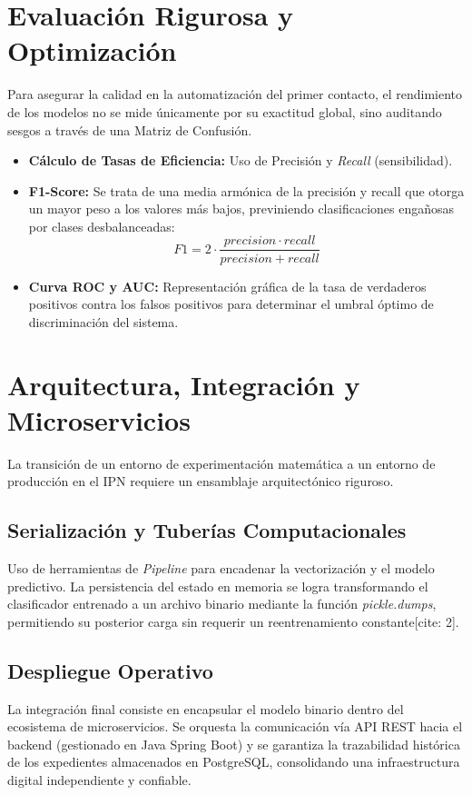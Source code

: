 \section{Evaluación Rigurosa y Optimización}

    Para asegurar la calidad en la automatización del primer contacto, el rendimiento de los modelos no se mide únicamente por su exactitud global, sino auditando sesgos a través de una Matriz de Confusión.
    
    \begin{itemize}
        \item \textbf{Cálculo de Tasas de Eficiencia:} Uso de Precisión y \textit{Recall} (sensibilidad).
        \item \textbf{F1-Score:} Se trata de una media armónica de la precisión y recall que otorga un mayor peso a los valores más bajos, previniendo clasificaciones engañosas por clases desbalanceadas:
        $$F1 = 2 \cdot \frac{precision \cdot recall}{precision + recall}$$
        \item \textbf{Curva ROC y AUC:} Representación gráfica de la tasa de verdaderos positivos contra los falsos positivos para determinar el umbral óptimo de discriminación del sistema.
    \end{itemize}

\section{Arquitectura, Integración y Microservicios}

    La transición de un entorno de experimentación matemática a un entorno de producción en el IPN requiere un ensamblaje arquitectónico riguroso.
    
    \subsection{Serialización y Tuberías Computacionales}
    Uso de herramientas de \textit{Pipeline} para encadenar la vectorización y el modelo predictivo. La persistencia del estado en memoria se logra transformando el clasificador entrenado a un archivo binario mediante la función \textit{pickle.dumps}, permitiendo su posterior carga sin requerir un reentrenamiento constante[cite: 2].
    
    \subsection{Despliegue Operativo}
    La integración final consiste en encapsular el modelo binario dentro del ecosistema de microservicios. Se orquesta la comunicación vía API REST hacia el backend (gestionado en Java Spring Boot) y se garantiza la trazabilidad histórica de los expedientes almacenados en PostgreSQL, consolidando una infraestructura digital independiente y confiable.